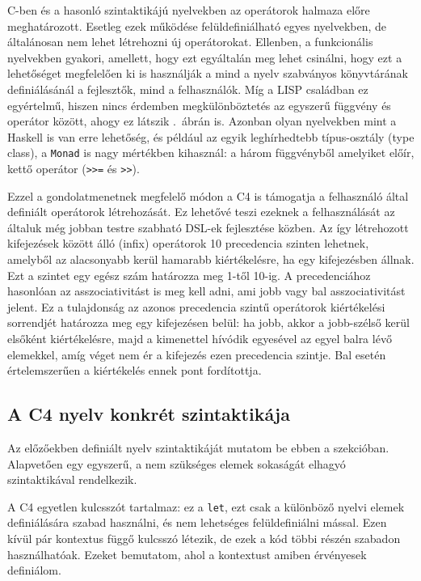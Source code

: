 C-ben és a hasonló szintaktikájú nyelvekben az operátorok halmaza előre meghatározott.
Esetleg ezek működése felüldefiniálható egyes nyelvekben, de általánosan nem lehet létrehozni új operátorokat.
Ellenben, a funkcionális nyelvekben gyakori, amellett, hogy ezt egyáltalán meg lehet csinálni, hogy ezt a lehetőséget megfelelően ki is használják a mind a nyelv szabványos könyvtárának definiálásánál a fejlesztők, mind a felhasználók.
Míg a LISP családban ez egyértelmű, hiszen nincs érdemben megkülönböztetés az egyszerű függvény és operátor között, ahogy ez látszik .~ábrán is.
Azonban olyan nyelvekben mint a Haskell is van erre lehetőség, és például az egyik leghírhedtebb típus-osztály (type class), a {\tt Monad} is nagy mértékben kihasznál: a három függvényből amelyiket előír, kettő operátor ({\tt >>=} és {\tt >>}).

Ezzel a gondolatmenetnek megfelelő módon a C4 is támogatja a felhasználó által definiált operátorok létrehozását.
Ez lehetővé teszi ezeknek a felhasználását az általuk még jobban testre szabható \gls{DSL}-ek fejlesztése közben.
Az így létrehozott kifejezések között álló (infix) operátorok 10 precedencia szinten lehetnek, amelyből az alacsonyabb kerül hamarabb kiértékelésre, ha egy kifejezésben állnak.
Ezt a szintet egy egész szám határozza meg 1-től 10-ig.
A precedenciához hasonlóan az asszociativitást is meg kell adni, ami jobb vagy bal asszociativitást jelent.
Ez a tulajdonság az azonos precedencia szintű operátorok kiértékelési sorrendjét határozza meg egy kifejezésen belül: ha jobb, akkor a jobb-szélső kerül elsőként kiértékelésre, majd a kimenettel hívódik egyesével az egyel balra lévő elemekkel, amíg véget nem ér a kifejezés ezen precedencia szintje.
Bal esetén értelemszerűen a kiértékelés ennek pont fordítottja.


\subsection{A C4 nyelv konkrét szintaktikája}

Az előzőekben definiált nyelv szintaktikáját mutatom be ebben a szekcióban.
Alapvetően egy egyszerű, a nem szükséges elemek sokaságát elhagyó szintaktikával rendelkezik.

A C4 egyetlen kulcsszót tartalmaz: ez a {\tt let}, ezt csak a különböző nyelvi elemek definiálására szabad használni, és nem lehetséges felüldefiniálni mással.
Ezen kívül pár kontextus függő kulcsszó létezik, de ezek a kód többi részén szabadon használhatóak.
Ezeket bemutatom, ahol a kontextust amiben érvényesek definiálom.

